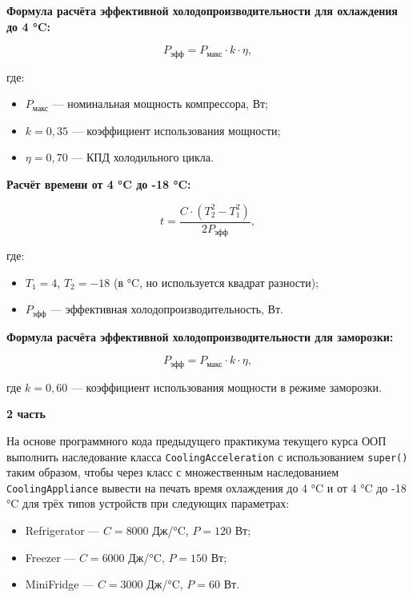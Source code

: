 \begin{enumerate}
\textbf{Формула расчёта эффективной холодопроизводительности для охлаждения до 4 °C:}

\begin{equation}
P_{\text{эфф}} = P_{\text{макс}} \cdot k \cdot \eta,
\end{equation}

где:  
\begin{itemize}
    \item $P_{\text{макс}}$ — номинальная мощность компрессора, Вт;  
    \item $k = 0{,}35$ — коэффициент использования мощности;  
    \item $\eta = 0{,}70$ — КПД холодильного цикла.  
\end{itemize}

\textbf{Расчёт времени от 4 °C до -18 °C:}

\begin{equation}
t = \frac{C \cdot (T_2^2 - T_1^2)}{2P_{\text{эфф}}},
\end{equation}

где:  
\begin{itemize}
    \item $T_1 = 4$, $T_2 = -18$ (в °C, но используется квадрат разности);  
    \item $P_{\text{эфф}}$ — эффективная холодопроизводительность, Вт.  
\end{itemize}

\textbf{Формула расчёта эффективной холодопроизводительности для заморозки:}

\begin{equation}
P_{\text{эфф}} = P_{\text{макс}} \cdot k \cdot \eta,
\end{equation}

где $k = 0{,}60$ — коэффициент использования мощности в режиме заморозки.

\textbf{2 часть}

На основе программного кода предыдущего практикума текущего курса ООП выполнить наследование класса \texttt{CoolingAcceleration} с использованием \texttt{super()} таким образом, чтобы через класс с множественным наследованием \texttt{CoolingAppliance} вывести на печать время охлаждения до 4 °C и от 4 °C до -18 °C для трёх типов устройств при следующих параметрах:

\begin{itemize}
    \item Refrigerator — $C = 8000$ Дж/°C, $P = 120$ Вт;  
    \item Freezer — $C = 6000$ Дж/°C, $P = 150$ Вт;  
    \item MiniFridge — $C = 3000$ Дж/°C, $P = 60$ Вт.  
\end{itemize}


\end{enumerate}
